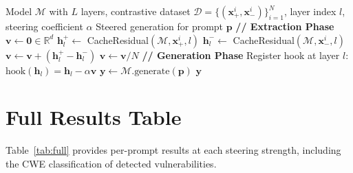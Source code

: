 \documentclass[journal, onecolumn]{IEEEtran}
\begin{document}
\begin{algorithm}[h]
\caption{Contrastive Activation Addition for Code Security}
\label{alg:caa}
\begin{algorithmic}[1]
\REQUIRE Model $\mathcal{M}$ with $L$ layers, contrastive dataset $\mathcal{D} = \{(\bm{x}^i_+, \bm{x}^i_-)\}_{i=1}^N$, layer index $l$, steering coefficient $\alpha$
\ENSURE Steered generation for prompt $\bm{p}$
\STATE \textbf{// Extraction Phase}
\STATE $\bm{v} \leftarrow \bm{0} \in \mathbb{R}^d$
    \STATE $\bm{h}^+_l \leftarrow$ CacheResidual$(\mathcal{M}, \bm{x}^i_+, l)$
    \STATE $\bm{h}^-_l \leftarrow$ CacheResidual$(\mathcal{M}, \bm{x}^i_-, l)$
    \STATE $\bm{v} \leftarrow \bm{v} + (\bm{h}^+_l - \bm{h}^-_l)$
\ENDFOR
\STATE $\bm{v} \leftarrow \bm{v} / N$
\STATE
\STATE \textbf{// Generation Phase}
\STATE Register hook at layer $l$:
\STATE \quad $\text{hook}(\bm{h}_l) = \bm{h}_l - \alpha \bm{v}$
\STATE $\bm{y} \leftarrow \mathcal{M}.\text{generate}(\bm{p})$
\RETURN $\bm{y}$
\end{algorithmic}
\end{algorithm}

\section{Full Results Table}
\label{app:full_results}

Table~\ref{tab:full} provides per-prompt results at each steering strength, including the CWE classification of detected vulnerabilities.
\end{document}
